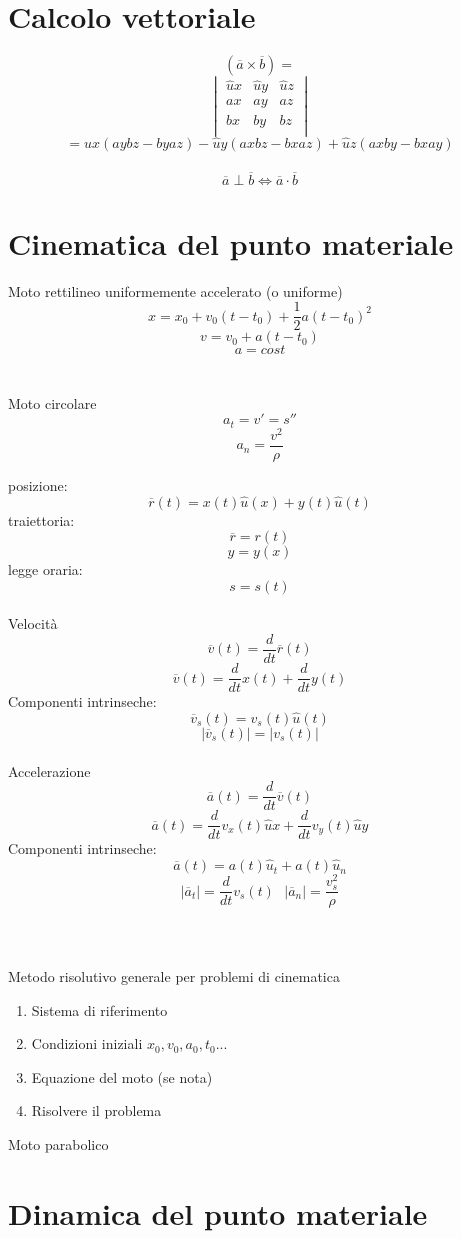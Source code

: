 \documentclass{article}
\begin{document}
\section{Calcolo vettoriale}

\[(\overline{a} \times \overline{b}) = \] 
\[
\begin{vmatrix}
	\hat{u}x & \hat{u}y & \hat{u}z \\
	ax       & ay       & az       \\
	bx       & by       & bz       \\ 
\end{vmatrix}
\]
\[
= \hat{u}x(aybz-byaz) -\hat{u}y(axbz-bxaz) +\hat{u}z(axby-bxay) 
\]\\
\[
\overline{a} \perp \overline{b} \iff \overline{a} \cdot \overline{b}
\]

\section{Cinematica del punto materiale}
\large{Moto rettilineo uniformemente accelerato (o uniforme)}
\[x=x_0+v_0(t-t_0)+\frac{1}{2}a(t-t_0)^2\]
\[v=v_0+a(t-t_0)\]
\[a=cost\]\\\\
\large{Moto circolare}
\[a_t=v'=s''\]
\[a_n=\frac{v^2}{\rho}\]

posizione: \[\overline{r}(t) = x(t)\hat{u}(x) + y(t)\hat{u}(t)\]
traiettoria: \[\overline{r} = r(t)\]   \[y = y(x)\]
legge oraria: \[s = s(t)\]
\\
\large{Velocità}
\[\overline{v}(t) = \frac{d}{dt}\overline{r}(t)\]
\[\overline{v}(t) = \frac{d}{dt}x(t) + \frac{d}{dt}y(t)\]
Componenti intrinseche: \[\overline{v}_s(t) = v_s(t)\hat{u}(t)\]
\[|\overline{v}_s(t)| = |v_s(t)|\]\\
\large{Accelerazione}
\[\overline{a}(t) = \frac{d}{dt}\overline{v}(t)\]
\[\overline{a}(t) = \frac{d}{dt}v_x(t)\hat{u}x + \frac{d}{dt}v_y(t)\hat{u}y\]
Componenti intrinseche: \[\overline{a}(t) = a(t)\hat{u}_t + a(t)\hat{u}_n\]
\[|\overline{a}_t| = \frac{d}{dt}v_s(t) \text{     } |\overline{a}_n| = \frac{v_s^2}{\rho}\]\\\\\\
\large{Metodo risolutivo generale per problemi di cinematica}
\begin{enumerate}
	\item Sistema di riferimento 
	\item Condizioni iniziali \(x_0, v_0, a_0, t_0 ...\)
	\item Equazione del moto (se nota)
	\item Risolvere il problema
\end{enumerate}
\large{Moto parabolico}


\section{Dinamica del punto materiale}
\end{document}
